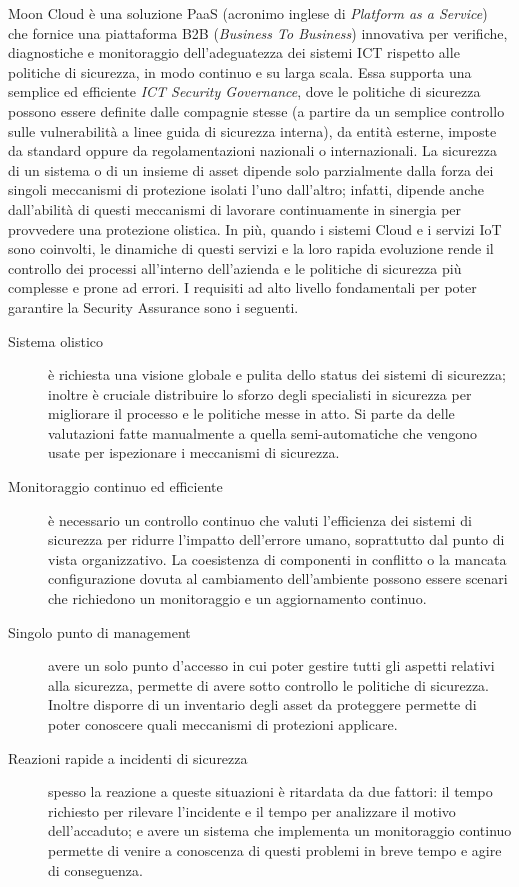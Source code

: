 Moon Cloud è una soluzione PaaS (acronimo inglese di \textit{Platform as a Service}) che fornice una piattaforma B2B 
(\textit{Business To Business}) innovativa per verifiche, diagnostiche e monitoraggio dell'adeguatezza dei sistemi ICT rispetto alle politiche di 
sicurezza, in modo continuo e su larga scala. Essa supporta una semplice ed efficiente \textit{ICT Security Governance}, dove le politiche 
di sicurezza possono essere definite dalle compagnie stesse (a partire da un semplice controllo sulle vulnerabilità a linee guida di
sicurezza interna), da entità esterne, imposte da standard oppure da regolamentazioni nazionali o internazionali.
La sicurezza di un sistema o di un insieme di asset dipende solo parzialmente dalla forza dei singoli meccanismi di protezione isolati
l'uno dall'altro; infatti, dipende anche dall'abilità di questi meccanismi di lavorare continuamente in sinergia per provvedere una 
protezione olistica.\hfill\break
%
In più, quando i sistemi Cloud e i servizi IoT sono coinvolti, le dinamiche di questi servizi e la loro rapida evoluzione rende il 
controllo dei processi all'interno dell'azienda e le politiche di sicurezza più complesse e prone ad errori. \vspace{0.5 cm}\hfill\break
I requisiti ad alto livello fondamentali per poter garantire la Security Assurance sono i seguenti.
\begin{description}
    \item[Sistema olistico] è richiesta una visione globale e pulita dello status dei sistemi di sicurezza; inoltre è cruciale 
    distribuire lo sforzo degli specialisti in sicurezza per migliorare il processo e le politiche messe in atto. Si parte da 
    delle valutazioni fatte manualmente a quella semi-automatiche che vengono usate per ispezionare i meccanismi di sicurezza. 
    \item[Monitoraggio continuo ed efficiente] è necessario un controllo continuo che valuti l'efficienza dei sistemi di sicurezza 
    per ridurre l'impatto dell'errore umano, soprattutto dal punto di vista organizzativo. La coesistenza di componenti in conflitto o
    la mancata configurazione dovuta al cambiamento dell'ambiente possono essere scenari che richiedono un monitoraggio e un 
    aggiornamento continuo.
    \item[Singolo punto di management] avere un solo punto d'accesso in cui poter gestire tutti gli aspetti relativi alla sicurezza, 
    permette di avere sotto controllo le politiche di sicurezza. Inoltre disporre di un inventario degli asset da proteggere permette di
    poter conoscere quali meccanismi di protezioni applicare.
    \item[Reazioni rapide a incidenti di sicurezza] spesso la reazione a queste situazioni è ritardata da due fattori: il tempo 
    richiesto per rilevare l'incidente e il tempo per analizzare il motivo dell'accaduto; e avere un sistema che implementa un monitoraggio
    continuo permette di venire a conoscenza di questi problemi in breve tempo e agire di conseguenza.
    \label{list:security-assurance-fondamentals}
\end{description}
